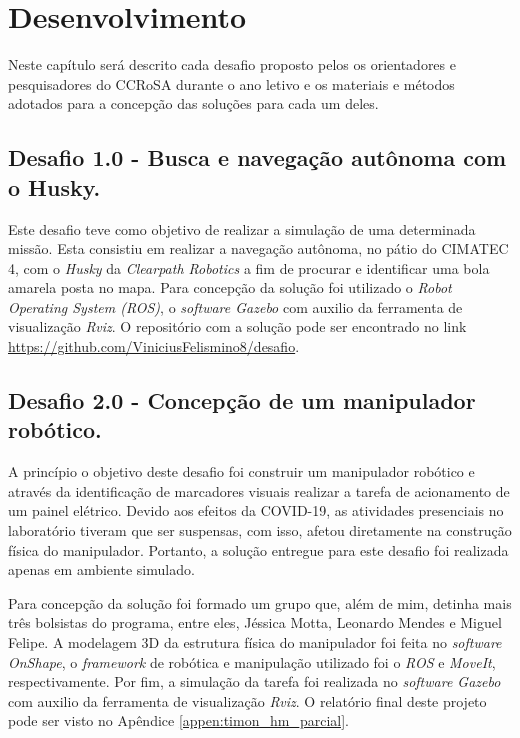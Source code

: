 \chapter{Desenvolvimento}
\label{chap:mat}

Neste capítulo será descrito cada desafio proposto pelos os orientadores e pesquisadores do CCRoSA durante o ano letivo e os materiais e métodos adotados para a concepção das soluções para cada um deles.

\section{Desafio 1.0 - Busca e navegação autônoma com o Husky.}

Este desafio teve como objetivo de realizar a simulação de uma determinada missão. Esta consistiu em realizar a navegação autônoma, no pátio do CIMATEC 4, com o \textit{Husky} da \textit{Clearpath Robotics} a fim de procurar e identificar uma bola amarela posta no mapa. Para concepção da solução foi utilizado o \textit{Robot Operating System (ROS)}, o \textit{software Gazebo} com auxilio da ferramenta de visualização \textit{Rviz}. O repositório com a solução pode ser encontrado no link \url{https://github.com/ViniciusFelismino8/desafio}.

\section{Desafio 2.0 - Concepção de um manipulador robótico.}
\label{sec:desafio2.0}

A princípio o objetivo deste desafio foi construir um manipulador robótico e através da identificação de marcadores visuais realizar a tarefa de acionamento de um painel elétrico. Devido aos efeitos da COVID-19, as atividades presenciais no laboratório tiveram que ser suspensas, com isso, afetou diretamente na construção física do manipulador. Portanto, a solução entregue para este desafio foi realizada apenas em ambiente simulado. 

Para concepção da solução foi formado um grupo que, além de mim, detinha mais três bolsistas do programa, entre eles, Jéssica Motta, Leonardo Mendes e Miguel Felipe. A modelagem 3D da estrutura física do manipulador foi feita no \textit{software OnShape}, o \textit{framework} de robótica e manipulação utilizado foi o \textit{ROS} e \textit{MoveIt}, respectivamente. Por fim, a simulação da tarefa foi realizada no \textit{software Gazebo} com auxilio da ferramenta de visualização \textit{Rviz}. O relatório final deste projeto pode ser visto no Apêndice \ref{appen:timon_hm_parcial}.

